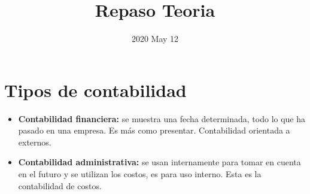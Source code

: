 \documentclass{article}
\title{Repaso Teoria}
\date{2020 May 12}
\begin{document}
\maketitle

\section{Tipos de contabilidad}
\begin{itemize}
    \item \textbf{Contabilidad financiera: } se muestra una fecha determinada, todo lo que ha pasado en una empresa. Es más como presentar. Contabilidad orientada a externos. 
    \item \textbf{Contabilidad administrativa: } se usan internamente para tomar en cuenta en el futuro y se utilizan los costos, es para uso interno. Esta es la contabilidad de costos. 
\end{itemize}

\end{document}
